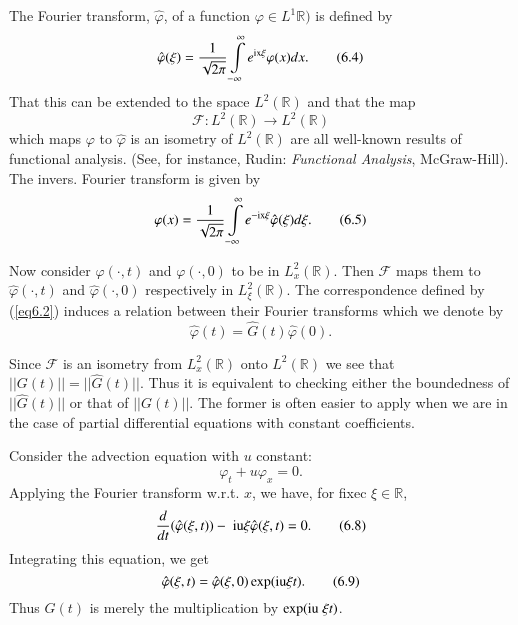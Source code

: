 The Fourier transform, $\hat{\varphi}$, of a function $\varphi \in L^1
\mathbb{R})$ is defined by 
\begin{equation*}
\hat{\varphi} (\xi) = \frac{1}{\sqrt{2\pi}}
\int\limits^\infty_{-\infty} e^{{\rm ix }\xi} \varphi (x)
dx. \tag{6.4}\label{eq6.4} 
\end{equation*}\pageoriginale 
That this can be extended to the space $L^2 (\mathbb{R})$ and that the
map
$$
\mathscr{F} : L^2 (\mathbb{R}) \to L^2 (\mathbb{R})
$$
which maps $\varphi$ to $\hat{\varphi}$ is an isometry of $L^2
(\mathbb{R})$ are all well-known results of functional analysis. (See,
for instance, Rudin: {\em Functional Analysis}, McGraw-Hill). The
invers. Fourier transform is given by 
\begin{equation*}
\varphi(x) = \frac{1}{\sqrt{2\pi}}  \int\limits^\infty_{-\infty}
e^{-{\rm ix} \xi} \hat{\varphi} (\xi) d\xi. \tag{6.5}\label{eq6.5}
\end{equation*}

Now consider $\varphi (\cdot, t)$ and $\varphi (\cdot, 0)$ to be in
$L^2_x(\mathbb{R})$. Then $\mathscr{F}$ maps them to $\hat{\varphi}
(\cdot, t)$ and $\hat{\varphi} (\cdot, 0)$ respectively in
$L^2_{\xi}(\mathbb{R})$. The correspondence defined by (\ref{eq6.2}) induces a
relation between their Fourier transforms which we denote by 
\begin{equation*}
\hat{\varphi} (t) = \hat{G} (t) \hat{\varphi} (0).\tag{6.6}\label{eq6.6}
\end{equation*}

Since $\mathscr{F}$ is an isometry from $L^2_x(\mathbb{R})$ onto
$L^2(\mathbb{R})$ we see that $||G(t)|| = ||\hat{G}(t)||$. Thus it is
equivalent to checking either the boundedness of $||\hat{G}(t)||$ or
that of $||G(t)||$. The former is often easier to apply when we are in
the case of partial differential equations with constant
coefficients. 

\begin{exam}\label{chap6:exam6.1}
Consider the advection equation with $u$ constant:
\begin{equation*}
\varphi_t + u \varphi_x =  0. \tag{6.7}\label{eq6.7}
\end{equation*}
Applying the Fourier transform w.r.t. $x$, we have, for fixec $\xi
\in \mathbb{R}$,
\begin{equation*}
\frac{d}{dt} (\hat{\varphi} (\xi, t)) - \; {\rm iu } \xi \hat{\varphi}
(\xi,t) = 0.\tag{6.8}\label{eq6.8}
\end{equation*}
Integrating this equation, we get
\begin{equation*}
\hat{\varphi} (\xi,t) = \hat{\varphi} (\xi, 0) \exp ({\rm iu } \xi
t).\tag{6.9}\label{eq6.9}
\end{equation*}\pageoriginale 
Thus $G(t)$ is merely the multiplication by $\exp ({\rm iu} \; \xi
t)$. 
\end{exam}

